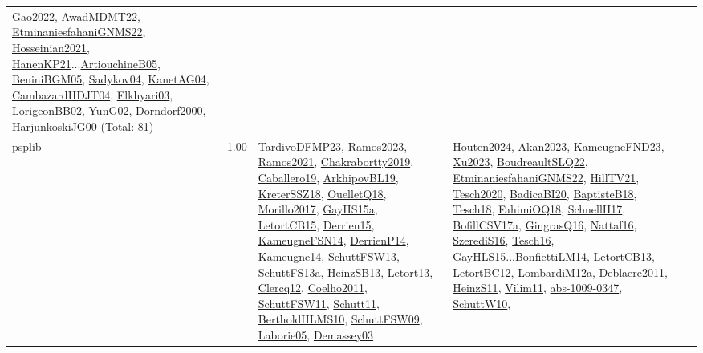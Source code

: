 {\begin{longtable}{p{3cm}r>{\raggedright\arraybackslash}p{6cm}>{\raggedright\arraybackslash}p{6cm}>{\raggedright\arraybackslash}p{8cm}}
\hyperref[detail:Gao2022]{Gao2022}, \hyperref[detail:AwadMDMT22]{AwadMDMT22}, \hyperref[detail:EtminaniesfahaniGNMS22]{EtminaniesfahaniGNMS22}, \hyperref[detail:Hosseinian2021]{Hosseinian2021}, \hyperref[detail:HanenKP21]{HanenKP21}...\hyperref[detail:ArtiouchineB05]{ArtiouchineB05}, \hyperref[detail:BeniniBGM05]{BeniniBGM05}, \hyperref[detail:Sadykov04]{Sadykov04}, \hyperref[detail:KanetAG04]{KanetAG04}, \hyperref[detail:CambazardHDJT04]{CambazardHDJT04}, \hyperref[detail:Elkhyari03]{Elkhyari03}, \hyperref[detail:LorigeonBB02]{LorigeonBB02}, \hyperref[detail:YunG02]{YunG02}, \hyperref[detail:Dorndorf2000]{Dorndorf2000}, \hyperref[detail:HarjunkoskiJG00]{HarjunkoskiJG00} (Total: 81)\\
\index{psplib}\index{Classification!psplib}psplib &  1.00 & \hyperref[detail:TardivoDFMP23]{TardivoDFMP23}, \hyperref[detail:Ramos2023]{Ramos2023}, \hyperref[detail:Ramos2021]{Ramos2021}, \hyperref[detail:Chakrabortty2019]{Chakrabortty2019}, \hyperref[detail:Caballero19]{Caballero19}, \hyperref[detail:ArkhipovBL19]{ArkhipovBL19}, \hyperref[detail:KreterSSZ18]{KreterSSZ18}, \hyperref[detail:OuelletQ18]{OuelletQ18}, \hyperref[detail:Morillo2017]{Morillo2017}, \hyperref[detail:GayHS15a]{GayHS15a}, \hyperref[detail:LetortCB15]{LetortCB15}, \hyperref[detail:Derrien15]{Derrien15}, \hyperref[detail:KameugneFSN14]{KameugneFSN14}, \hyperref[detail:DerrienP14]{DerrienP14}, \hyperref[detail:Kameugne14]{Kameugne14}, \hyperref[detail:SchuttFSW13]{SchuttFSW13}, \hyperref[detail:SchuttFS13a]{SchuttFS13a}, \hyperref[detail:HeinzSB13]{HeinzSB13}, \hyperref[detail:Letort13]{Letort13}, \hyperref[detail:Clercq12]{Clercq12}, \hyperref[detail:Coelho2011]{Coelho2011}, \hyperref[detail:SchuttFSW11]{SchuttFSW11}, \hyperref[detail:Schutt11]{Schutt11}, \hyperref[detail:BertholdHLMS10]{BertholdHLMS10}, \hyperref[detail:SchuttFSW09]{SchuttFSW09}, \hyperref[detail:Laborie05]{Laborie05}, \hyperref[detail:Demassey03]{Demassey03} & \hyperref[detail:Houten2024]{Houten2024}, \hyperref[detail:Akan2023]{Akan2023}, \hyperref[detail:KameugneFND23]{KameugneFND23}, \hyperref[detail:Xu2023]{Xu2023}, \hyperref[detail:BoudreaultSLQ22]{BoudreaultSLQ22}, \hyperref[detail:EtminaniesfahaniGNMS22]{EtminaniesfahaniGNMS22}, \hyperref[detail:HillTV21]{HillTV21}, \hyperref[detail:Tesch2020]{Tesch2020}, \hyperref[detail:BadicaBI20]{BadicaBI20}, \hyperref[detail:BaptisteB18]{BaptisteB18}, \hyperref[detail:Tesch18]{Tesch18}, \hyperref[detail:FahimiOQ18]{FahimiOQ18}, \hyperref[detail:SchnellH17]{SchnellH17}, \hyperref[detail:BofillCSV17a]{BofillCSV17a}, \hyperref[detail:GingrasQ16]{GingrasQ16}, \hyperref[detail:Nattaf16]{Nattaf16}, \hyperref[detail:SzerediS16]{SzerediS16}, \hyperref[detail:Tesch16]{Tesch16}, \hyperref[detail:GayHLS15]{GayHLS15}...\hyperref[detail:BonfiettiLM14]{BonfiettiLM14}, \hyperref[detail:LetortCB13]{LetortCB13}, \hyperref[detail:LetortBC12]{LetortBC12}, \hyperref[detail:LombardiM12a]{LombardiM12a}, \hyperref[detail:Deblaere2011]{Deblaere2011}, \hyperref[detail:HeinzS11]{HeinzS11}, \hyperref[detail:Vilim11]{Vilim11}, \hyperref[detail:abs-1009-0347]{abs-1009-0347}, \hyperref[detail:SchuttW10]{SchuttW10}, 
\end{longtable}}
